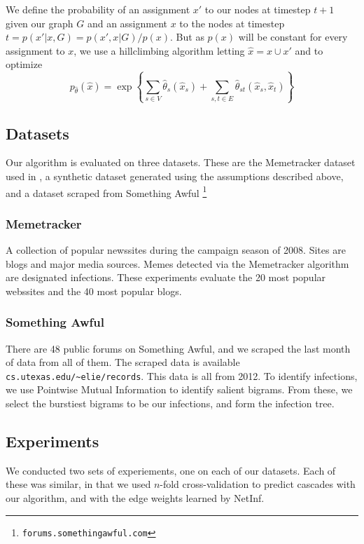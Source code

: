 \documentclass{article} %
\begin{document}
We define the probability of an assignment $x'$ to our nodes at timestep $t+1$ given our graph $G$ and an assignment $x$ to the nodes at timestep $t  
=
p(x'|x,G)=p(x',x|G)/p(x)
$. But as $p(x)$ will be constant for every assignment to $x$, we use a hillclimbing algorithm letting
 $\hat{x}=x\cup x'$ and to optimize 
  $$p_{\hat{\theta}}(\hat{x})
  =\exp \left\{ \sum_{s\in V}\hat{\theta}_s(\hat{x}_s)+\sum_{s,t\in E}\hat{\theta}_{st}(\hat{x}_s,\hat{x}_t)\right\} $$


\subsection{Datasets}
\label{data}

Our algorithm is evaluated on three datasets. These are the Memetracker dataset used in \cite{memetracker}, a synthetic dataset generated using the assumptions described above, and a dataset scraped from Something Awful \footnote{\texttt{forums.somethingawful.com}}

\subsubsection{Memetracker}

A collection of popular newssites during the campaign season of 2008. Sites are blogs and major media sources. Memes detected via the Memetracker algorithm \cite{memetracker} are designated infections. These experiments evaluate the 20 most popular webssites and the 40 most popular blogs.

\subsubsection{Something Awful}
 There are 48 public forums on Something Awful, and we scraped the last month of data from all of them.  The scraped data is available \texttt{cs.utexas.edu/\textasciitilde elie/records}. This data is all from 2012. To identify infections, we use Pointwise Mutual Information \cite{pmi} to identify salient bigrams. From these, we select the burstiest bigrams to be our infections, and form the infection tree.

\subsection{Experiments}
\label{experiments}

We conducted two sets of experiements, one on each of our datasets. Each of these was similar, in that we used $n$-fold cross-validation to predict cascades with our algorithm, and with the edge weights learned by NetInf.
\end{document}
